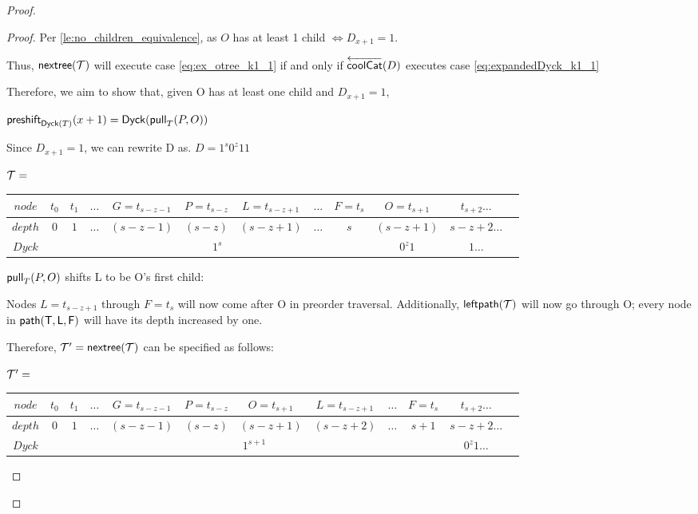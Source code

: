 \begin{proof}
\begin{proof}
    Per \ref{le:no_children_equivalence}, as $O$ has at least 1 child $\iff D_{x+1}=1$.

    Thus, $\nextTree{T}$ will execute case \eqref{eq:ex_otree_k1_1} if and only if $\coolCat{D}$ executes case \eqref{eq:expandedDyck_k1_1}

    Therefore, we aim to show that, given O has at least one child and $D_{x+1}=1$,

    $\preshift{\dyck{T}}{x+1}=\dyck{\poppush[T]{P}{O}}$

    Since $D_{x+1}=1$, we can rewrite D as.
    $D=1^s0^z11$


    \noindent $\tree{T}=$
    \begin{center}
	\begin{tabular}{ |c|c|c|c|c|c|c|c|c|c|c|c| } 
	    \hline

	    $node$ & $t_0$ & $t_1$ & $\dots$ & $G=t_{s-z-1}$ & $P=t_{s-z}$ & $L=t_{s-z+1}$ & $\dots$ & $F=t_s$ & $O=t_{s+1}$ & $t_{s+2}\dots$ \\
	    \hline
	    $depth$ & $0$ & $1$ & $\dots$ & $(s-z-1)$ & $(s-z)$ & $(s-z+1)$ & $\dots$ & $s$  & $(s-z+1)$ & $s-z+2 \dots$\\
	    \hline
	    $Dyck$ &  &  \multicolumn{7}{|c|}{$1^s$} &  $0^{z}1$   & $1\dots$\\
	    \hline
	\end{tabular}
    \end{center}

    $\poppush[T]{P}{O}$
    shifts L to be O's first child:

    Nodes $L=t_{s-z+1}$ through $F=t_s$ will now come after O in preorder traversal.  Additionally, $\leftdown{\tree{T}}$ will now go through O; every node in $\path{T}{L}{F}$ will have its depth increased by one.  

    Therefore, $\tree{T}'=\nextTree{T}$ can be specified as follows: 

    \noindent $\tree{T}'=$
    \begin{center}
	\begin{tabular}{ |c|c|c|c|c|c|c|c|c|c|c|c| } 
	    \hline

	    $node$ & $t_0$ & $t_1$ & $\dots$ & $G=t_{s-z-1}$ & $P=t_{s-z}$ & $O=t_{s+1}$ & $L=t_{s-z+1}$ & $\dots$ & $F=t_s$  & $t_{s+2}\dots$ \\
	    \hline
	    $depth$ & $0$ & $1$ & $\dots$ & $(s-z-1)$ & $(s-z)$ & $(s-z+1)$ & $(s-z+2)$ & $\dots$ & $s+1$  & $s-z+2 \dots$\\
	    \hline
	    $Dyck$ &  &  \multicolumn{8}{|c|}{$1^{s+1}$}  & $0^{z}1\dots$\\
	    \hline
	\end{tabular}
    \end{center}


\end{proof}
\end{proof}
